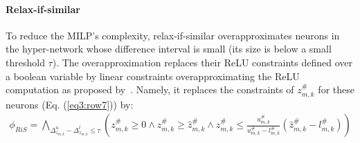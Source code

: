 \paragraph{Relax-if-similar} To reduce the MILP's complexity, relax-if-similar overapproximates neurons in the hyper-network whose difference interval is small (its size is below a small threshold $\tau$). The overapproximation replaces their ReLU constraints defined over a boolean variable by linear constraints overapproximating the ReLU computation as proposed by~\citet{Ehlers17}.
Namely, it replaces the constraints of $z^\#_{m,k}$ for these neurons (Eq. (\ref{eq3:row7})) by:
\begin{align*}
\phi_{RiS}=\bigwedge_{\Delta^u_{z_{m,k}}-\Delta^l_{z_{m,k}}\leq \tau }
 \left(z^\#_{m,k} \geq 0 \wedge z^\#_{m,k} \geq \hat{z}^\#_{m,k}\wedge z^\#_{m,k} \leq \frac{u^\#_{m,k}}{u^\#_{m,k} - l^\#_{m,k}} (\hat{z}^\#_{m,k} - l^\#_{m,k}) \right) 
\end{align*}


\begin{comment}
\begin{algorithm}[t]
\caption{MD and SE constraints}
\label{alg:ME_SE}
\DontPrintSemicolon
\KwIn{The classifier $D$, the hyper-network $D^\#$.}
\KwOut{$\phi_{MD}$, $\phi_{SE}$}
\end{algorithm}
\end{comment} 